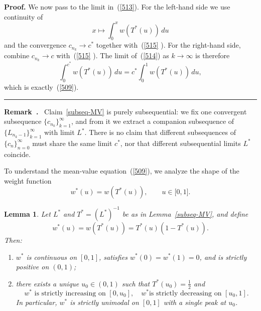 \documentclass[onecolumn]{article}
\newtheorem{lemma}[theorem]{Lemma}
\newenvironment{remark}{  \refstepcounter{theorem}  \par\medskip\noindent\textbf{Remark~\thetheorem.}\rmfamily\ }{\par\medskip}
\newenvironment{proof}[1][Proof]{\noindent\textbf{#1.} }{\ \rule{0.5em}{0.5em}}
\begin{document}
\begin{proof}
We now pass to the limit in~(\ref{513}). For the left-hand side we use
continuity of 
\begin{equation}
x\mapsto \int_{0}^{x}w(T^{\ast }(u))\,du  \label{516}
\end{equation}%
and the convergence $c_{n_{k}}\rightarrow c^{\ast }$ together with~(\ref{515}%
). For the right-hand side, combine $c_{n_{k}}\rightarrow c$ with~(\ref{515}%
). The limit of~(\ref{514}) as $k\rightarrow \infty $ is therefore 
\begin{equation}
\int_{0}^{c^{\ast }}w(T^{\ast }(u))\,du=c^{\ast }\int_{0}^{1}w(T^{\ast
}(u))\,du,  \label{517}
\end{equation}%
which is exactly~(\ref{509}). \medskip
\end{proof}

\begin{remark}
Claim~\ref{subseq-MV} is purely subsequential: we fix one convergent
subsequence $\{c_{n_{k}}\}_{k=1}^{\infty }$, and from it we extract a
companion subsequence of $\{L_{n_{k}-1}\}_{k=1}^{\infty }$ with limit $%
L^{\ast }$. There is no claim that different subsequences of $%
\{c_{n}\}_{n=0}^{\infty }$ must share the same limit $c^{\ast }$, nor that
different subsequential limits $L^{\ast }$ coincide.
\end{remark}

To understand the mean-value equation~(\ref{509}), we analyze the shape of
the weight function 
\begin{equation}
w^{\ast }(u)=w(T^{\ast }(u)),\qquad u\in \lbrack 0,1].  \label{518}
\end{equation}

\begin{lemma}
\label{unimodal-subseq} Let $L^{\ast }$ and $T^{\ast }=(L^{\ast })^{-1}$ be
as in Lemma~\ref{subseq-MV}, and define 
\begin{equation}
w^{\ast }(u)=w(T^{\ast }(u))=T^{\ast }(u)(1-T^{\ast }(u)).  \label{519}
\end{equation}%
Then:

\begin{enumerate}
\item $w^{\ast }$ is continuous on $[0,1]$, satisfies $w^{\ast }(0)=w^{\ast
}(1)=0$, and is strictly positive on $(0,1)$;

\item there exists a unique $u_{0}\in (0,1)$ such that $T^{\ast }(u_{0})=%
\tfrac{1}{2}$ and 
\begin{equation}
w^{\ast }\text{ is strictly increasing on }[0,u_{0}],\quad w^{\ast }\text{
is strictly decreasing on }[u_{0},1].  \label{520}
\end{equation}%
In particular, $w^{\ast }$ is strictly unimodal on $[0,1]$ with a single
peak at $u_{0}$.
\end{enumerate}
\end{lemma}
\end{document}
